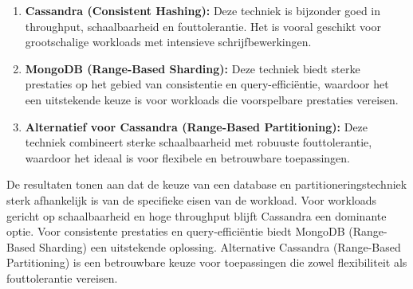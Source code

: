 \begin{enumerate}
    \item \textbf{Cassandra (Consistent Hashing):} Deze techniek is bijzonder goed in throughput, schaalbaarheid en fouttolerantie. Het is vooral geschikt voor grootschalige workloads met intensieve schrijfbewerkingen.
    \item \textbf{MongoDB (Range-Based Sharding):} Deze techniek biedt sterke prestaties op het gebied van consistentie en query-efficiëntie, waardoor het een uitstekende keuze is voor workloads die voorspelbare prestaties vereisen.
    \item \textbf{Alternatief voor Cassandra (Range-Based Partitioning):} Deze techniek combineert sterke schaalbaarheid met robuuste fouttolerantie, waardoor het ideaal is voor flexibele en betrouwbare toepassingen.
\end{enumerate}

De resultaten tonen aan dat de keuze van een database en partitioneringstechniek sterk afhankelijk is van de specifieke eisen van de workload.
 Voor workloads gericht op schaalbaarheid en hoge throughput blijft Cassandra een dominante optie. Voor consistente prestaties en query-efficiëntie biedt MongoDB (Range-Based Sharding) een uitstekende oplossing.
Alternative Cassandra (Range-Based Partitioning) is een betrouwbare keuze voor toepassingen die zowel flexibiliteit als fouttolerantie vereisen.